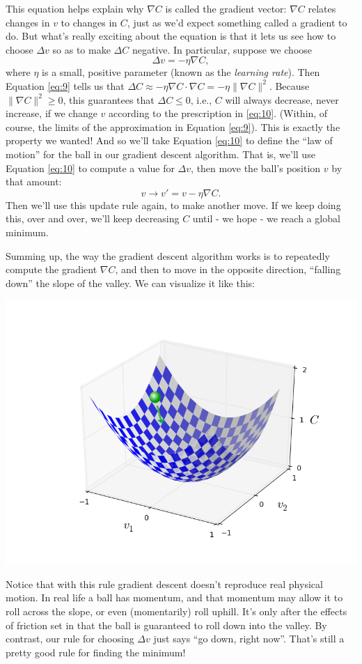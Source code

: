\documentclass[a4paper,twoside,10pt]{book}
\begin{document}
This equation helps explain why $\nabla C$ is called the gradient vector: $\nabla C$ relates changes in $v$ to changes in $C$, just as we'd expect something called a gradient to do. But what's really exciting about the equation is that it lets us see how to choose $\Delta v$ so as to make $\Delta C$ negative. In particular, suppose we choose
\begin{equation}
	 \Delta v = -\eta \nabla C,
	 \label{eq:10}
\end{equation}
where $\eta$ is a small, positive parameter (known as the \textit{learning rate}). Then Equation \ref{eq:9} tells us that $ \Delta C \approx -\eta \nabla C \cdot \nabla C = -\eta \|\nabla C\|^2$. Because $\| \nabla C\|^2 \geq 0$, this guarantees that $\Delta C \leq 0$, i.e., $C$ will always decrease, never increase, if we change $v$ according to the prescription in \ref{eq:10}. (Within, of course, the limits of the approximation in Equation \ref{eq:9}). This is exactly the property we wanted! And so we'll take Equation \ref{eq:10} to define the ``law of motion'' for the ball in our gradient descent algorithm. That is, we'll use Equation \ref{eq:10} to compute a value for $\Delta v$, then move the ball's position $v$ by that amount:
\begin{equation}
v \to v' = v -\eta \nabla C. \label{eq:11}
\end{equation}
Then we'll use this update rule again, to make another move. If we keep doing this, over and over, we'll keep decreasing $C$ until - we hope - we reach a global minimum.

Summing up, the way the gradient descent algorithm works is to repeatedly compute the gradient $\nabla C$, and then to move in the opposite direction, ``falling down'' the slope of the valley. We can visualize it like this:
\begin{center}
	\includegraphics[width=0.65\linewidth]{./figures/ch1/valley_with_ball}
\end{center}
Notice that with this rule gradient descent doesn't reproduce real physical motion. In real life a ball has momentum, and that momentum may allow it to roll across the slope, or even (momentarily) roll uphill. It's only after the effects of friction set in that the ball is guaranteed to roll down into the valley. By contrast, our rule for choosing $\Delta v$ just says ``go down, right now''. That's still a pretty good rule for finding the minimum!
\end{document}
